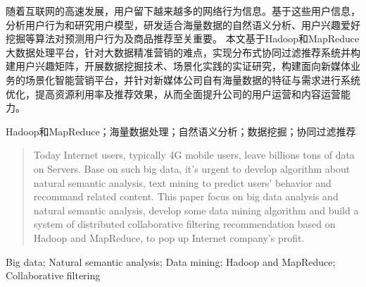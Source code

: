 

\begin{zhaiyao}
随着互联网的高速发展，用户留下越来越多的网络行为信息。基于这些用户信息，分析用户行为和研究用户模型，研发适合海量数据的自然语义分析、用户兴趣爱好挖掘等算法对预测用户行为及商品推荐至关重要。
本文基于Hadoop和MapReduce大数据处理平台，针对大数据精准营销的难点，实现分布式协同过滤推荐系统并构建用户兴趣矩阵，开展数据挖掘技术、场景化实践的实证研究，构建面向新媒体业务的场景化智能营销平台，并针对新媒体公司自有海量数据的特征与需求进行系统优化，提高资源利用率及推荐效果，从而全面提升公司的用户运营和内容运营能力。
\end{zhaiyao}

\begin{guanjianci}
Hadoop和MapReduce；海量数据处理；自然语义分析；数据挖掘；协同过滤推荐
\end{guanjianci}



\begin{abstract}
Today Internet users, typically 4G mobile users, leave billions tons of data on Servers. Base on such big data, it's urgent to develop algorithm about natural semantic analysis, text mining to predict users' behavior and recommand related content.
This paper focus on big data analysis and natural semantic analysis, develop some data mining algorithm and build a system of distributed collaborative filtering recommendation based on Hadoop and MapReduce, to pop up Internet company's profit.
\end{abstract}



\begin{keywords}
Big data; Natural semantic analysis; Data mining; Hadoop and MapReduce; Collaborative filtering
\end{keywords} 